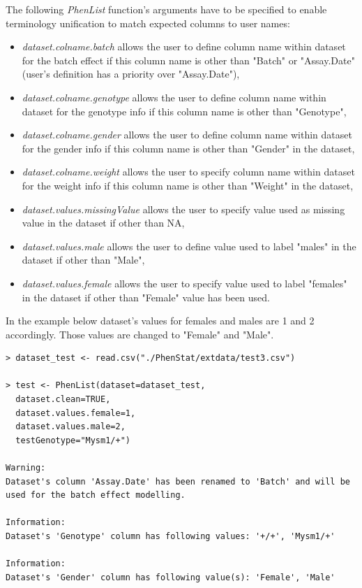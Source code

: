 \documentclass[12pt,a4paper]{article}
\begin{document}
The following \textit{PhenList} function's arguments have to be specified to enable terminology unification to match expected columns to user names:
\begin{itemize}
\item \textit{dataset.colname.batch} allows the user to define column name within dataset for the batch effect if this column name is other than "Batch" or "Assay.Date" (user's definition has a priority over "Assay.Date"), 
\item \textit{dataset.colname.genotype} allows the user to define column name within dataset for the genotype info if this column name is other than "Genotype", 
\item \textit{dataset.colname.gender} allows the user to define column name within dataset for the gender info if this column name is other than "Gender" in the dataset, 
\item \textit{dataset.colname.weight}  allows the user to specify column name within dataset for the weight info if this column name is other than "Weight" in the dataset, 
\item \textit{dataset.values.missingValue}  allows the user to specify value used as missing value in the dataset if other than NA,
\item \textit{dataset.values.male} allows the user to define value used to label "males" in the dataset if other than "Male", 
\item \textit{dataset.values.female} allows the user to specify value used to label "females" in the dataset if other than "Female" value has been used.
\end{itemize} 

In the example below dataset's values for females and males are 1 and 2 accordingly. Those values are changed to "Female" and "Male".  
\begingroup
    \fontsize{8pt}{12pt}\selectfont
\begin{verbatim}
> dataset_test <- read.csv("./PhenStat/extdata/test3.csv")

> test <- PhenList(dataset=dataset_test, 
  dataset.clean=TRUE, 
  dataset.values.female=1, 
  dataset.values.male=2, 
  testGenotype="Mysm1/+")

Warning:
Dataset's column 'Assay.Date' has been renamed to 'Batch' and will be used for the batch effect modelling.

Information:
Dataset's 'Genotype' column has following values: '+/+', 'Mysm1/+'

Information:
Dataset's 'Gender' column has following value(s): 'Female', 'Male'  
\end{verbatim}
\endgroup
\end{document}

